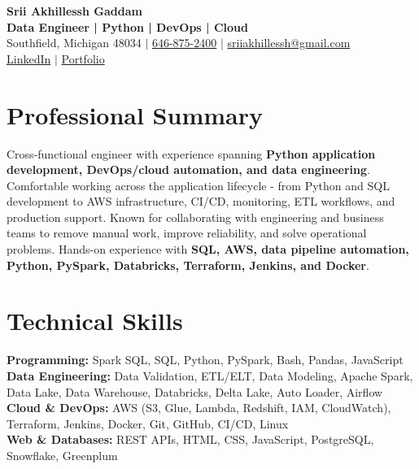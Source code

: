 \documentclass[letterpaper,10pt]{article}
\begin{document}
\fontsize{9.35pt}{10.45pt}\selectfont

\begin{center}
    {\LARGE \textbf{Srii Akhillessh Gaddam}} \\[-1pt]
    \textbf{Data Engineer | Python | DevOps | Cloud} \\[2pt]
    Southfield, Michigan 48034 $|$
    \href{tel:6468752400}{646-875-2400} $|$
    \href{mailto:sriiakhillessh@gmail.com}{sriiakhillessh@gmail.com} \\[1pt]
    \href{https://www.linkedin.com/in/srii-akhiilessh-gaddam-b48668191/}{LinkedIn} $|$
    \href{https://sriiakhillesshg.github.io/portfolio/}{Portfolio}
\end{center}
\vspace{-8pt}

\section{Professional Summary}
\small{Cross-functional engineer with experience spanning \textbf{Python application development, DevOps/cloud automation, and data engineering}. Comfortable working across the application lifecycle - from Python and SQL development to AWS infrastructure, CI/CD, monitoring, ETL workflows, and production support. Known for collaborating with engineering and business teams to remove manual work, improve reliability, and solve operational problems. Hands-on experience with \textbf{SQL, AWS, data pipeline automation, Python, PySpark, Databricks, Terraform, Jenkins, and Docker}.}

\section{Technical Skills}
\small{
\textbf{Programming:} Spark SQL, SQL, Python, PySpark, Bash, Pandas, JavaScript \\
\textbf{Data Engineering:} Data Validation, ETL/ELT, Data Modeling, Apache Spark, Data Lake, Data Warehouse, Databricks, Delta Lake, Auto Loader, Airflow \\
\textbf{Cloud \& DevOps:} AWS (S3, Glue, Lambda, Redshift, IAM, CloudWatch), Terraform, Jenkins, Docker, Git, GitHub, CI/CD, Linux \\
\textbf{Web \& Databases:} REST APIs, HTML, CSS, JavaScript, PostgreSQL, Snowflake, Greenplum
}
\end{document}
